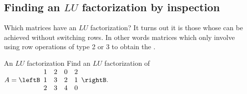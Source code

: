 \subsection{Finding an $LU$ factorization by inspection}

Which matrices have an $LU$ factorization? It turns out it is those whose
{\ef} can be achieved without switching rows. In other words matrices which
only involve using row operations of type 2 or 3 to obtain the {\ef}.

\begin{example}{An $LU$ factorization}{}
Find an $LU$ factorization of $A=\leftB
\begin{array}{cccc}
1 & 2 & 0 & 2 \\
1 & 3 & 2 & 1 \\
2 & 3 & 4 & 0%
\end{array}
\rightB .$
\end{example}

